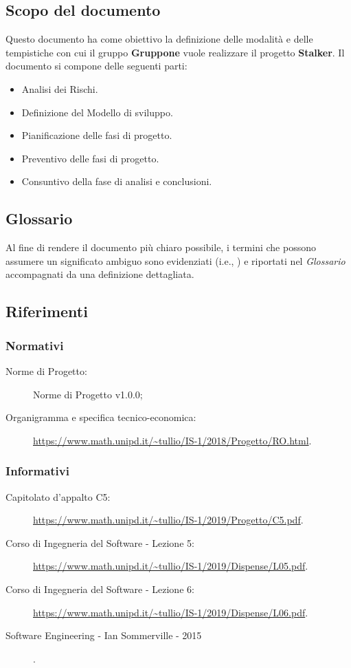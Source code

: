 \documentclass[../piano-di-progetto.tex]{subfiles}
\begin{document}
\subsection{Scopo del documento}%
\label{sub:scopo_del_documento}
Questo documento ha come obiettivo la definizione delle modalità e delle tempistiche con cui il gruppo \textbf{Gruppone} vuole realizzare il progetto \textbf{Stalker}.
Il documento si compone delle seguenti parti:
\begin{itemize}
  \item Analisi dei Rischi.
  \item Definizione del Modello di sviluppo.
  \item Pianificazione delle fasi di progetto.
  \item Preventivo delle fasi di progetto.
  \item Consuntivo della fase di analisi e conclusioni.
\end{itemize}
\subsection{Glossario}%
\label{sub:glossario}
Al fine di rendere il documento più chiaro possibile, i termini che possono assumere un significato ambiguo sono evidenziati (i.e., ) e riportati nel \textit{Glossario} accompagnati da una definizione dettagliata.
\subsection{Riferimenti}%
\label{sub:riferimenti}
\subsubsection{Normativi}%
\label{subs:normativi}
\begin{description}
  \item[Norme di Progetto:] Norme di Progetto v1.0.0;
  \item[Organigramma e specifica tecnico-economica:] \url{https://www.math.unipd.it/~tullio/IS-1/2018/Progetto/RO.html}.
\end{description}
\subsubsection{Informativi}%
\label{subs:informativi}
\begin{description}
  \item[Capitolato d'appalto C5:] \url{https://www.math.unipd.it/~tullio/IS-1/2019/Progetto/C5.pdf}.
  \item[Corso di Ingegneria del Software - Lezione 5:] \url{https://www.math.unipd.it/~tullio/IS-1/2019/Dispense/L05.pdf}.
  \item[Corso di Ingegneria del Software - Lezione 6:] \url{https://www.math.unipd.it/~tullio/IS-1/2019/Dispense/L06.pdf}.
  \item[Software Engineering - Ian Sommerville - 2015].
\end{description}%
\end{document}
